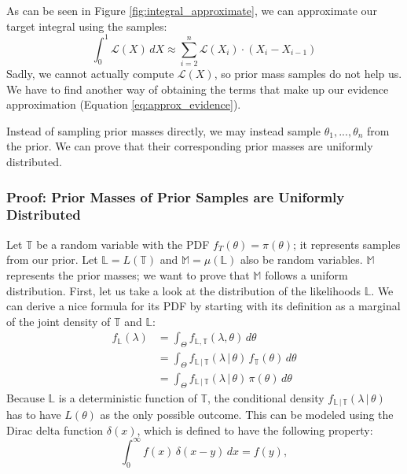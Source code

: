 \documentclass[12pt, a4paper]{report}
\begin{document}
As can be seen in Figure \ref{fig:integral_approximate}, we can approximate our target integral using the samples:
\begin{equation}
    \int_0^1 \mathcal{L}(X) \, dX \approx \sum_{i=2}^n \mathcal{L}(X_i) \cdot (X_i - X_{i-1}) \label{eq:approx_evidence}
\end{equation}
Sadly, we cannot actually compute $\mathcal{L}(X)$, so prior mass samples do not help us.
We have to find another way of obtaining the terms that make up our evidence approximation (Equation \ref{eq:approx_evidence}).

Instead of sampling prior masses directly, we may instead sample $\theta_1, ..., \theta_n$ from the prior.
We can prove that their corresponding prior masses are uniformly distributed.

\subsubsection{Proof: Prior Masses of Prior Samples are Uniformly Distributed}
Let $\mathbb{T}$ be a random variable with the PDF $f_T(\theta) = \pi(\theta)$; it represents samples from our prior.
Let $\mathbb{L} = L(\mathbb{T})$ and $\mathbb{M} = \mu(\mathbb{L})$ also be random variables.
$\mathbb{M}$ represents the prior masses; we want to prove that $\mathbb{M}$ follows a uniform distribution.
First, let us take a look at the distribution of the likelihoods $\mathbb{L}$.
We can derive a nice formula for its PDF by starting with its definition as a marginal of the joint density of $\mathbb{T}$ and $\mathbb{L}$:
\begin{align}
    f_\mathbb{L}(\lambda) &= \int_\Theta f_{\mathbb{L}, \mathbb{T}}(\lambda, \theta) \, d\theta \nonumber\\
    &= \int_\Theta f_{\mathbb{L} \,|\, \mathbb{T}}(\lambda \,|\, \theta) \, f_\mathbb{T}(\theta) \, d\theta \nonumber\\
    &= \int_\Theta f_{\mathbb{L} \,|\, \mathbb{T}}(\lambda \,|\, \theta) \, \pi(\theta) \, d\theta \label{eq:L_integral}
\end{align}
Because $\mathbb{L}$ is a deterministic function of $\mathbb{T}$, the conditional density $f_{\mathbb{L} \,|\, \mathbb{T}}(\lambda \,|\, \theta)$ has to have $L(\theta)$ as the only possible outcome.
This can be modeled using the Dirac delta function $\delta(x)$, which is defined to have the following property:
\begin{equation}
    \int_0^\infty f(x) \, \delta(x - y) \, dx = f(y), \label{eq:dirac_delta_property}
\end{equation}
\end{document}
